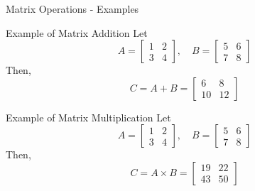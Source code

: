 \documentclass[aspectratio=169]{beamer}
\begin{document}
\begin{frame}[fragile]{Matrix Operations - Examples}
    \begin{block}{Example of Matrix Addition}
        Let 
        \[
        A = \begin{bmatrix}
        1 & 2 \\
        3 & 4
        \end{bmatrix}, \quad 
        B = \begin{bmatrix}
        5 & 6 \\
        7 & 8
        \end{bmatrix}
        \]
        Then,
        \[
        C = A + B = \begin{bmatrix}
        6 & 8 \\
        10 & 12
        \end{bmatrix}
        \]
    \end{block}
    
    \begin{block}{Example of Matrix Multiplication}
        Let 
        \[
        A = \begin{bmatrix}
        1 & 2 \\
        3 & 4
        \end{bmatrix}, \quad 
        B = \begin{bmatrix}
        5 & 6 \\
        7 & 8
        \end{bmatrix}
        \]
        Then,
        \[
        C = A \times B = \begin{bmatrix}
        19 & 22 \\
        43 & 50
        \end{bmatrix}
        \]
    \end{block}
\end{frame}
\end{document}

